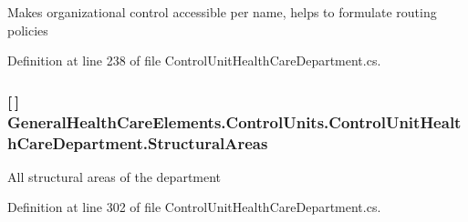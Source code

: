 Makes organizational control accessible per name, helps to formulate routing policies 



Definition at line 238 of file Control\+Unit\+Health\+Care\+Department.\+cs.

\subsubsection[{\texorpdfstring{Structural\+Areas}{StructuralAreas}}]{ \mbox{[}$\,$\mbox{]} General\+Health\+Care\+Elements.\+Control\+Units.\+Control\+Unit\+Health\+Care\+Department.\+Structural\+Areas\hspace{0.3cm}{\ttfamily [get]}}\hypertarget{class_general_health_care_elements_1_1_control_units_1_1_control_unit_health_care_department_a688b2a2c255cf90d8687e988637bdf39}{}\label{class_general_health_care_elements_1_1_control_units_1_1_control_unit_health_care_department_a688b2a2c255cf90d8687e988637bdf39}


All structural areas of the department 



Definition at line 302 of file Control\+Unit\+Health\+Care\+Department.\+cs.


